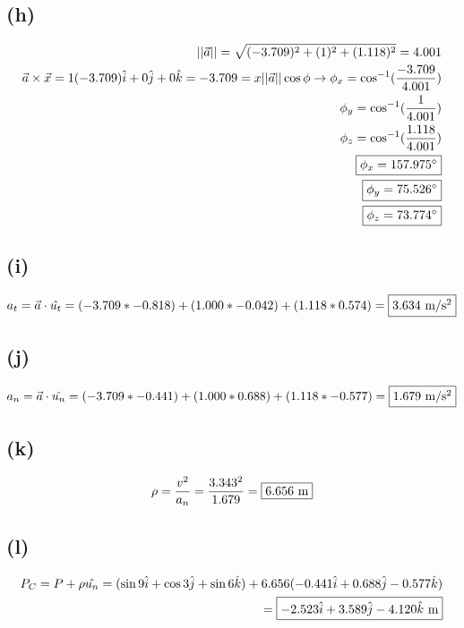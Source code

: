 \documentclass[12 pt]{article}
\begin{document}
\subsection*{(h)}
\begin{align*}
    ||\vec{a}||=\sqrt{(-3.709)^2 + (1)^2 + (1.118)^2}=4.001 \\
    \vec{a}\times \vec{x}=1(-3.709)\hat{i} + 0\hat{j} + 0\hat{k}=-3.709=x||\vec{a}||\cos{\phi} \rightarrow
    \phi_x=\cos^{-1}(\frac{-3.709}{4.001}) \\
    \phi_y=\cos^{-1}(\frac{1}{4.001}) \\
    \phi_z=\cos^{-1}(\frac{1.118}{4.001}) \\
    \fbox{$\phi_x=157.975^\circ$} \\
    \fbox{$\phi_y=75.526^\circ$} \\
    \fbox{$\phi_z=73.774^\circ$}
\end{align*}

\subsection*{(i)}
\begin{align*}
    a_t=\vec{a}\cdot \hat{u_t}=(-3.709*-0.818) + (1.000*-0.042) + (1.118*0.574) = \fbox{$3.634$ m/s$^2$}
\end{align*}

\subsection*{(j)}
\begin{align*}
    a_n=\vec{a}\cdot \hat{u_n}=(-3.709*-0.441) + (1.000*0.688) + (1.118*-0.577) = \fbox{$1.679$ m/s$^2$}
\end{align*}

\subsection*{(k)}
\begin{align*}
    \rho=\frac{v^2}{a_n}=\frac{3.343^2}{1.679}=\fbox{$6.656$ m}
\end{align*}

\subsection*{(l)}
\begin{align*}
    P_C=P+\rho \hat{u_n}=(\sin{9}\hat{i} + \cos{3}\hat{j} + \sin{6}\hat{k}) + 6.656(-0.441\hat{i} + 0.688\hat{j} -0.577\hat{k}) \\
    =\fbox{$-2.523\hat{i} + 3.589\hat{j} - 4.120\hat{k}$ m}
\end{align*}
\end{document}

